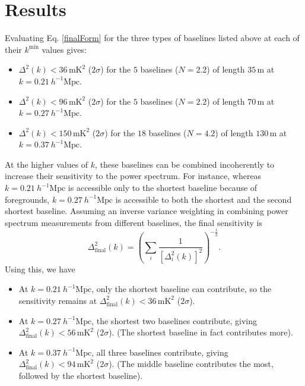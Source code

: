\documentclass[11pt]{article}
\begin{document}
\section{Results}
Evaluating Eq. \ref{finalForm} for the three types of baselines listed above at each of their $k^\textrm{min}$ values gives:
\begin{itemize}
\item $\Delta^2 (k) < 36\,\textrm{mK}^2$ ($2\sigma$) for the $5$ baselines ($N=2.2$) of length $35\,\textrm{m}$ at $k= 0.21~h^{-1}\textrm{Mpc}$.
\item $\Delta^2 (k) < 96\,\textrm{mK}^2$ ($2\sigma$) for the $5$ baselines ($N=2.2$) of length $70\,\textrm{m}$ at $k= 0.27~h^{-1}\textrm{Mpc}$.
\item $\Delta^2 (k) < 150\,\textrm{mK}^2$ ($2\sigma$) for the $18$ baselines ($N=4.2$) of length $130\,\textrm{m}$ at $k= 0.37~h^{-1}\textrm{Mpc}$.
\end{itemize}
At the higher values of $k$, these baselines can be combined incoherently to increase their sensitivity to the power spectrum.  For instance, whereas $k= 0.21~h^{-1}\textrm{Mpc}$ is accessible only to the shortest baseline because of foregrounds, $k= 0.27~h^{-1}\textrm{Mpc}$ is accessible to both the shortest and the second shortest baseline.  Assuming an inverse variance weighting in combining power spectrum measurements from different baselines, the final sensitivity is
\begin{equation}
\Delta_\textrm{final}^2 (k) = \left( \sum_i \frac{1}{[\Delta^2_i(k)]^2}\right)^{-\frac{1}{2}}.
\end{equation}
Using this, we have
\begin{itemize}
\item At $k= 0.21~h^{-1}\textrm{Mpc}$, only the shortest baseline can contribute, so the sensitivity remains at $\Delta^2_\textrm{final} (k) < 36\,\textrm{mK}^2$ ($2\sigma$).
\item At $k= 0.27~h^{-1}\textrm{Mpc}$, the shortest two baselines contribute, giving $\Delta^2_\textrm{final} (k) < 56\,\textrm{mK}^2$ ($2\sigma$).  (The shortest baseline in fact contributes more).
\item At $k= 0.37~h^{-1}\textrm{Mpc}$, all three baselines contribute, giving $\Delta^2_\textrm{final} (k) < 94\,\textrm{mK}^2$ ($2\sigma$).  (The middle baseline contributes the most, followed by the shortest baseline).
\end{itemize}


  
\end{document}
